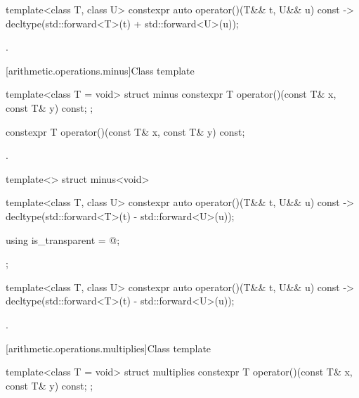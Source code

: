 %
\begin{itemdecl}
template<class T, class U> constexpr auto operator()(T&& t, U&& u) const
    -> decltype(std::forward<T>(t) + std::forward<U>(u));
\end{itemdecl}

\begin{itemdescr}
\pnum
\returns
{}.
\end{itemdescr}

[arithmetic.operations.minus]{Class template }

%
\begin{itemdecl}
template<class T = void> struct minus {
  constexpr T operator()(const T& x, const T& y) const;
};
\end{itemdecl}

%
\begin{itemdecl}
constexpr T operator()(const T& x, const T& y) const;
\end{itemdecl}

\begin{itemdescr}
\pnum
\returns
{}.
\end{itemdescr}

%
\begin{itemdecl}
template<> struct minus<void> {
  template<class T, class U> constexpr auto operator()(T&& t, U&& u) const
    -> decltype(std::forward<T>(t) - std::forward<U>(u));

  using is_transparent = @\unspec@;
};
\end{itemdecl}

%
\begin{itemdecl}
template<class T, class U> constexpr auto operator()(T&& t, U&& u) const
    -> decltype(std::forward<T>(t) - std::forward<U>(u));
\end{itemdecl}

\begin{itemdescr}
\pnum
\returns
{}.
\end{itemdescr}

[arithmetic.operations.multiplies]{Class template }

%
\begin{itemdecl}
template<class T = void> struct multiplies {
  constexpr T operator()(const T& x, const T& y) const;
};
\end{itemdecl}

